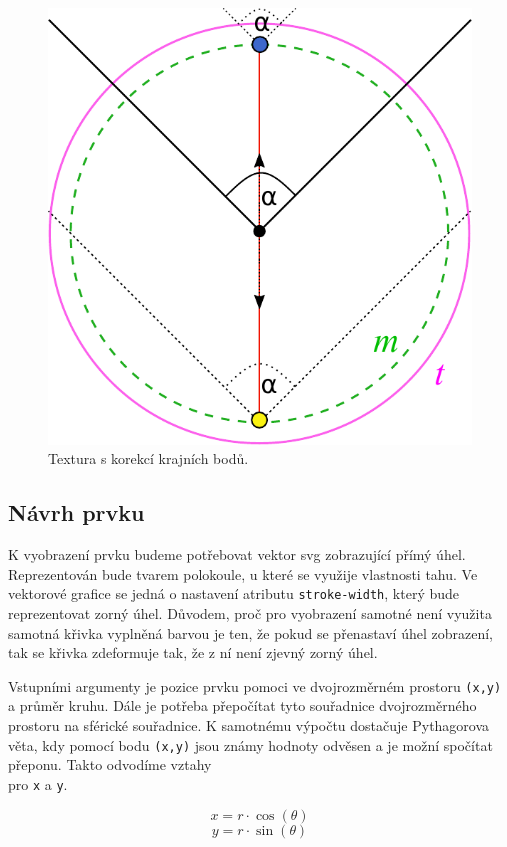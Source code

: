 \begin{figure}[h]
	\label{img:field_vision_implementation}
	\centering
	\includegraphics[scale=1.0,angle=0,width=0.45\linewidth]{obrazky-figures/field_vision_implementation}
	\caption{Textura s korekcí krajních bodů.}
\end{figure}




\newpage

\subsection{Návrh prvku}
K vyobrazení prvku budeme potřebovat vektor svg zobrazující přímý úhel. Reprezentován bude tvarem polokoule, u které se využije vlastnosti tahu. Ve vektorové grafice se jedná o nastavení atributu \texttt{stroke-width}, který bude reprezentovat zorný úhel. Důvodem, proč pro vyobrazení samotné není využita samotná křivka vyplněná barvou je ten, že pokud se přenastaví úhel zobrazení, tak se křivka zdeformuje tak, že z ní není zjevný zorný úhel.

Vstupními argumenty je pozice prvku pomoci ve dvojrozměrném prostoru \texttt{(x,y)} a průměr kruhu. Dále je potřeba přepočítat tyto souřadnice dvojrozměrného prostoru na sférické souřadnice. K samotnému výpočtu dostačuje Pythagorova věta, kdy pomocí bodu \texttt{(x,y)} jsou známy hodnoty odvěsen a je možní spočítat přeponu. Takto odvodíme vztahy \\pro \texttt{x} a \texttt{y}.


 $$ x = r\cdot\cos(\theta) $$ 
 $$ y = r\cdot\sin(\theta) $$  






\newpage


